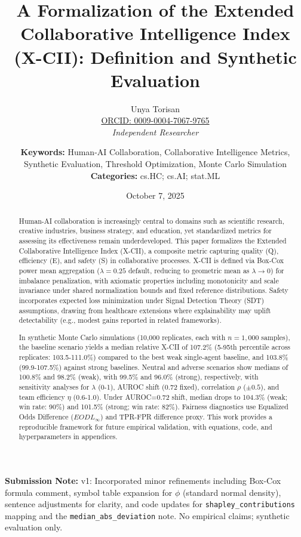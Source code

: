 \documentclass[a4paper]{article}
\title{A Formalization of the Extended Collaborative Intelligence Index (X-CII): Definition and Synthetic Evaluation}
\author{
    Unya Torisan \\
    \href{https://orcid.org/0009-0004-7067-9765}{ORCID: 0009-0004-7067-9765} \\
    \textit{Independent Researcher}
    \and
    \vspace{1em}
    \textbf{Keywords:} Human-AI Collaboration, Collaborative Intelligence Metrics, \\ Synthetic Evaluation, Threshold Optimization, Monte Carlo Simulation \\
    \textbf{Categories:} cs.HC; cs.AI; stat.ML
}
\date{October 7, 2025}
\begin{document}
\maketitle

\textbf{Submission Note:} v1: Incorporated minor refinements including Box-Cox formula comment, symbol table expansion for $\phi$ (standard normal density), sentence adjustments for clarity, and code updates for \texttt{shapley\_contributions} mapping and the \texttt{median\_abs\_deviation} note. No empirical claims; synthetic evaluation only.

\begin{abstract}
Human-AI collaboration is increasingly central to domains such as scientific research, creative industries, business strategy, and education, yet standardized metrics for assessing its effectiveness remain underdeveloped. This paper formalizes the Extended Collaborative Intelligence Index (X-CII), a composite metric capturing quality (Q), efficiency (E), and safety (S) in collaborative processes. X-CII is defined via Box-Cox power mean aggregation ($\lambda=0.25$ default, reducing to geometric mean as $\lambda\to0$) for imbalance penalization, with axiomatic properties including monotonicity and scale invariance under shared normalization bounds and fixed reference distributions. Safety incorporates expected loss minimization under Signal Detection Theory (SDT) assumptions, drawing from healthcare extensions where explainability may uplift detectability (e.g., modest gains reported in related frameworks).

In synthetic Monte Carlo simulations (10,000 replicates, each with $n=1,000$ samples), the baseline scenario yields a median relative X-CII of 107.2\% (5-95th percentile across replicates: 103.5-111.0\%) compared to the best weak single-agent baseline, and 103.8\% (99.9-107.5\%) against strong baselines. Neutral and adverse scenarios show medians of 100.8\% and 98.2\% (weak), with 99.5\% and 96.0\% (strong), respectively, with sensitivity analyses for $\lambda$ (0-1), AUROC shift (0.72 fixed), correlation $\rho$ ($\pm0.5$), and team efficiency $\eta$ (0.6-1.0). Under AUROC=0.72 shift, median drops to 104.3\% (weak; win rate: 90\%) and 101.5\% (strong; win rate: 82\%). Fairness diagnostics use Equalized Odds Difference ($EOD L_\infty$) and TPR-FPR difference proxy. This work provides a reproducible framework for future empirical validation, with equations, code, and hyperparameters in appendices.
\end{abstract}
\end{document}
